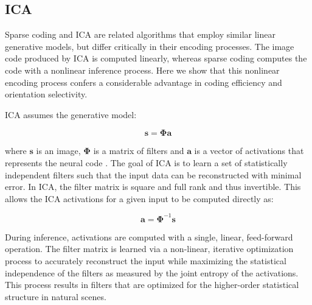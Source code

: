 

\subsection{ICA}
Sparse coding and ICA are related algorithms that employ similar linear generative models, but differ critically in their encoding processes. The image code produced by ICA is computed linearly, whereas sparse coding computes the code with a nonlinear inference process. Here we show that this nonlinear encoding process confers a considerable advantage in coding efficiency and orientation selectivity.

ICA assumes the generative model:

\begin{equation}
\mathbf{s} = \mathbf{\Phi a}
\end{equation}

where $\mathbf{s}$ is an image, $\mathbf{\Phi}$ is a matrix of filters and $\mathbf{a}$ is a vector of activations that represents the neural code \parencite{bell1997independent}. The goal of ICA is to learn a set of statistically independent filters such that the input data can be reconstructed with minimal error. In ICA, the filter matrix is square and full rank and thus invertible. This allows the ICA activations for a given input to be computed directly as:

\begin{equation}
\mathbf{\hat{a}} = \mathbf{\Phi}^{-1}\mathbf{s}
\end{equation}

During inference, activations are computed with a single, linear, feed-forward operation. The filter matrix is learned via a non-linear, iterative optimization process to accurately reconstruct the input while maximizing the statistical independence of the filters as measured by the joint entropy of the activations. This process results in filters that are optimized for the higher-order statistical structure in natural scenes.

